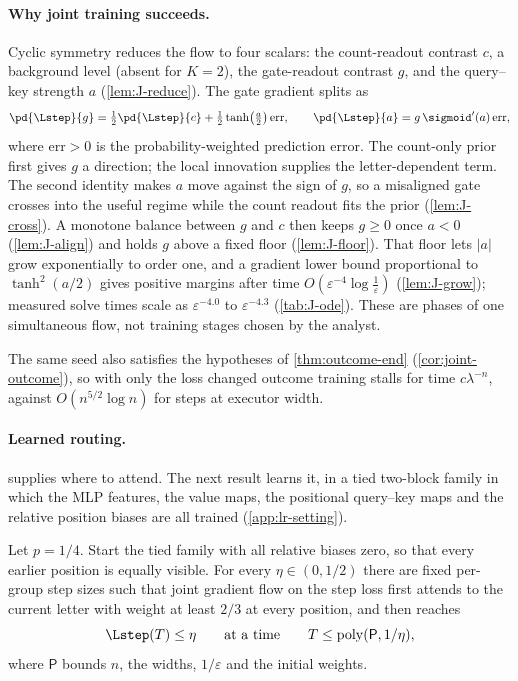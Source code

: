 \paragraph{Why joint training succeeds.} Cyclic symmetry reduces the flow to four scalars: the count-readout contrast $c$,
a background level (absent for $K=2$), the gate-readout contrast $g$, and the query--key strength $a$ (\cref{lem:J-reduce}).
The gate gradient splits as
\[
 \pd{\Lstep}{g}=\tfrac12\pd{\Lstep}{c}+\tfrac12\tanh\bigl(\tfrac a2\bigr)\,\mathrm{err},\qquad
 \pd{\Lstep}{a}=g\,\sigmoid'(a)\,\mathrm{err},
\]
where $\mathrm{err}>0$ is the probability-weighted prediction error. The count-only prior first gives $g$ a direction; the
local innovation supplies the letter-dependent term. The second identity makes $a$ move against the sign of $g$, so a
misaligned gate crosses into the useful regime while the count readout fits the prior (\cref{lem:J-cross}). A monotone
balance between $g$ and $c$ then keeps $g\ge0$ once $a<0$ (\cref{lem:J-align}) and holds $g$ above a fixed floor
(\cref{lem:J-floor}). That floor lets $|a|$ grow exponentially to order one, and a gradient lower bound proportional to
$\tanh^2(a/2)$ gives positive margins after time $O(\varepsilon^{-4}\log\frac1\varepsilon)$ (\cref{lem:J-grow}); measured solve times scale as
$\varepsilon^{-4.0}$ to $\varepsilon^{-4.3}$ (\cref{tab:J-ode}). These are phases of one simultaneous flow, not training stages chosen
by the analyst.

The same seed also satisfies the hypotheses of \cref{thm:outcome-end} (\cref{cor:joint-outcome}), so with only the loss changed
outcome training stalls for time $c\lambda^{-n}$, against $O(n^{5/2}\log n)$ for steps at executor width.

\paragraph{Learned routing.}  supplies where to attend. The next result learns it, in a tied two-block family
in which the MLP features, the value maps, the positional query--key maps and the relative position biases are all
trained (\cref{app:lr-setting}).

\begin{theorem}
\label{thm:routing}
Let $p=1/4$. Start the tied family with all relative biases zero, so that every earlier position is
equally visible. For every $\eta\in(0,1/2)$ there are fixed per-group step sizes such that joint
gradient flow on the step loss first attends to the current letter with weight at least $2/3$ at every
position, and then reaches
\[
 \Lstep(T)\le\eta\qquad\text{at a time}\qquad T\le\operatorname{poly}(\mathsf P,1/\eta),
\]
where $\mathsf P$ bounds $n$, the widths, $1/\varepsilon$ and the initial weights.
\end{theorem}

